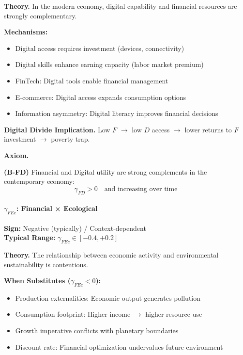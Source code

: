 \textbf{Theory.}
In the modern economy, digital capability and financial resources are 
strongly complementary.

\textbf{Mechanisms:}
\begin{itemize}
    \item Digital access requires investment (devices, connectivity)
    \item Digital skills enhance earning capacity (labor market premium)
    \item FinTech: Digital tools enable financial management
    \item E-commerce: Digital access expands consumption options
    \item Information asymmetry: Digital literacy improves financial decisions
\end{itemize}

\textbf{Digital Divide Implication.}
Low $F$ $\rightarrow$ low $D$ access $\rightarrow$ lower returns to $F$ 
investment $\rightarrow$ poverty trap.

\textbf{Axiom.}
\begin{axiom}
\label{ax:B-FD}
\textbf{(B-FD)} Financial and Digital utility are strong complements in 
the contemporary economy:
\begin{equation}
    \gamma_{FD} > 0 \quad \text{and increasing over time}
\end{equation}
\end{axiom}


\paragraph{$\gamma_{FEc}$: Financial × Ecological}

\begin{tcolorbox}[colback=red!5, colframe=red!50!black]
\textbf{Sign:} Negative (typically) / Context-dependent \\
\textbf{Typical Range:} $\gamma_{FEc} \in [-0.4, +0.2]$
\end{tcolorbox}

\textbf{Theory.}
The relationship between economic activity and environmental sustainability 
is contentious.

\textbf{When Substitutes ($\gamma_{FEc} < 0$):}
\begin{itemize}
    \item Production externalities: Economic output generates pollution
    \item Consumption footprint: Higher income $\rightarrow$ higher resource use
    \item Growth imperative conflicts with planetary boundaries
    \item Discount rate: Financial optimization undervalues future environment
\end{itemize}

